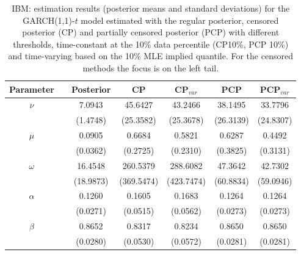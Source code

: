 { \renewcommand{\arraystretch}{1.2} 
\begin{table} 
\center 
\begin{tabular}{cc ccccc} 
Parameter & & Posterior & CP & CP$_{var}$& PCP & PCP$_{var}$ \\ \hline \hline 
\rowcolor{LightCyan} 
$\nu$&& 7.0943 & 45.6427 & 43.2466 & 38.1495 & 33.7796 \\ 
&&    (1.4748) & (25.3582) & (25.3678)  & (26.3139) & (24.8307)  \\ 
\rowcolor{LightCyan} 
$\mu$&& 0.0905 & 0.6684 & 0.5821 & 0.6287 & 0.4492 \\ 
&&    (0.0362) & (0.2725) & (0.2310)  & (0.3825) & (0.3131)  \\ 
\rowcolor{LightCyan} 
$\omega$&& 16.4548 & 260.5379 & 288.6082 & 47.3642 & 42.7302 \\ 
&&    (18.9873) & (369.5474) & (423.7474)  & (60.8834) & (59.0946)  \\ 
\rowcolor{LightCyan} 
$\alpha$&& 0.1260 & 0.1605 & 0.1683 & 0.1264 & 0.1264 \\ 
&&    (0.0271) & (0.0515) & (0.0562)  & (0.0273) & (0.0273)  \\ 
\rowcolor{LightCyan} 
$\beta$&& 0.8652 & 0.8317 & 0.8234 & 0.8650 & 0.8650 \\ 
&&    (0.0280) & (0.0530) & (0.0572)  & (0.0281) & (0.0281)  \\ 
\hline 
\end{tabular}
 \caption{IBM: estimation results (posterior means and standard deviations)  for the GARCH(1,1)-$t$ model  estimated with the regular posterior, censored posterior (CP) and partially censored posterior (PCP) with different thresholds,  time-constant at the 10\% data percentile (CP10\%, PCP 10\%) and time-varying based on the 10\% MLE implied quantile. For the censored methods the focus is on the left tail. }
\label{tab:IBM_estim}  
\end{table}
}